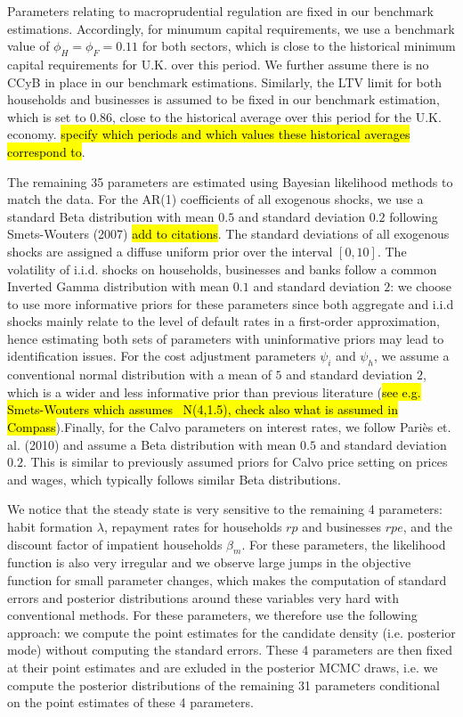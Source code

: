 \documentclass[12pt]{article}
\numberwithin{equation}{section}
\begin{document}
Parameters relating to macroprudential regulation are fixed in our benchmark estimations. Accordingly, for minumum capital requirements, we use a benchmark value of $\phi_H=\phi_F=0.11$ for both sectors, which is close to the historical minimum capital requirements for U.K. over this period. We further assume there is no CCyB in place in our benchmark estimations.  Similarly, the LTV limit for both households and businesses is assumed to be fixed in our benchmark estimation, which is set to $0.86$, close to the historical average over this period for the U.K. economy. \hl{specify which periods and which values these historical averages correspond to}. 


The remaining 35 parameters are estimated using Bayesian likelihood methods to match the data. For the AR(1) coefficients of all exogenous shocks, we use a standard Beta distribution with mean $0.5$ and standard deviation $0.2$ following Smets-Wouters (2007) \hl{add to citations}. The standard deviations of all exogenous shocks are assigned a diffuse uniform prior over the interval $[0,10]$. The volatility of i.i.d. shocks on households, businesses and banks follow a common Inverted Gamma distribution with mean $0.1$ and standard deviation $2$: we choose to use more informative priors for these parameters since both aggregate and i.i.d shocks mainly relate to the level of default rates in a first-order approximation, hence estimating both sets of parameters with uninformative priors may lead to identification issues. For the cost adjustment parameters $\psi_i$ and $\psi_h$, we assume a conventional normal distribution with a mean of $5$ and standard deviation $2$, which is a wider and less informative prior than previous literature (\hl{see e.g. Smets-Wouters which assumes ~N(4,1.5), check also what is assumed in Compass}).Finally, for the Calvo parameters on interest rates, we follow Pariès et. al. (2010) and assume a Beta distribution with mean $0.5$ and standard deviation $0.2$. This is similar to previously assumed priors for Calvo price setting on prices and wages, which typically follows similar Beta distributions. 

We notice that the steady state is very sensitive to the remaining 4 parameters: habit formation $\lambda$, repayment rates for households $rp$ and businesses $rpe$, and the discount factor of impatient households $\beta_m$. For these parameters, the likelihood function is also very irregular and we observe large jumps in the objective function for small parameter changes, which makes the computation of standard errors and posterior distributions around these variables very hard with conventional methods. For these parameters, we therefore use the following approach: we compute the point estimates for the candidate density (i.e. posterior mode) without computing the standard errors. These 4 parameters are then fixed at their point estimates and are exluded in the posterior MCMC draws, i.e. we compute the posterior distributions of the remaining 31 parameters conditional on the point estimates of these 4 parameters. 
\end{document}
